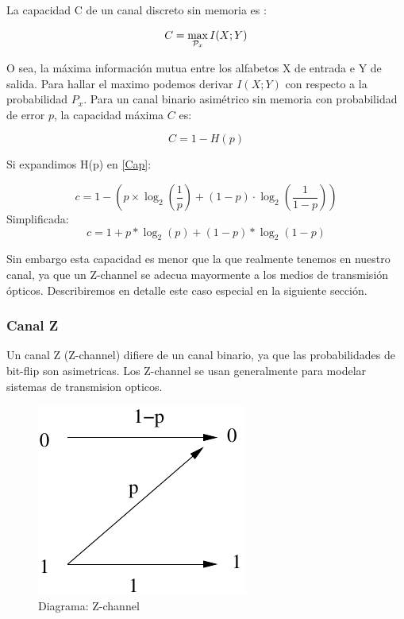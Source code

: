 \documentclass[a4paper,10pt]{report}
\begin{document}
La capacidad C de un canal discreto sin memoria es :

\begin{equation}
C = \max_{{\cal{P}}_x} I(X;Y) 
\end{equation}

O sea, la máxima información mutua entre los alfabetos X de entrada e Y de salida.
Para hallar el maximo podemos derivar $I(X;Y)$ con respecto a la probabilidad $P_x$.
Para un canal binario asimétrico sin memoria con probabilidad de error $p$, la capacidad máxima $C$ es:

\begin{equation}\label{Cap}
C = 1 - H(p) 
\end{equation}

Si expandimos H(p) en \ref{Cap}:

$$ c = 1-\left(p \times \log_2\left(\frac{1}{p}\right) + (1-p) \cdot \log_2\left(\frac{1}{1-p}\right)\right) $$
Simplificada:
$$ c = 1 + p * \log_2(p) + (1 - p) * \log_2(1-p) $$

Sin embargo esta capacidad es menor que la que realmente tenemos en nuestro canal, ya que un Z-channel se adecua mayormente a los medios de transmisión ópticos. Describiremos en detalle este caso especial en la siguiente sección.

\subsubsection{Canal Z}
Un canal Z (Z-channel) difiere de un canal binario, ya que las probabilidades de bit-flip son asimetricas.
Los Z-channel se usan generalmente para modelar sistemas de transmision opticos.

\begin{figure}[th]
  \begin{center}
    \includegraphics[scale=0.5]{capacidad/zchannel}
  \end{center}
  \caption{Diagrama: Z-channel}
  \label{fig:Gal}
\end{figure}
\end{document}
